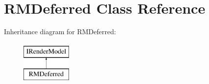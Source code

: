 \hypertarget{class_r_m_deferred}{}\section{R\+M\+Deferred Class Reference}
\label{class_r_m_deferred}
Inheritance diagram for R\+M\+Deferred\+:\begin{figure}[H]
\begin{center}
\leavevmode
\includegraphics[height=2.000000cm]{class_r_m_deferred}
\end{center}
\end{figure}
